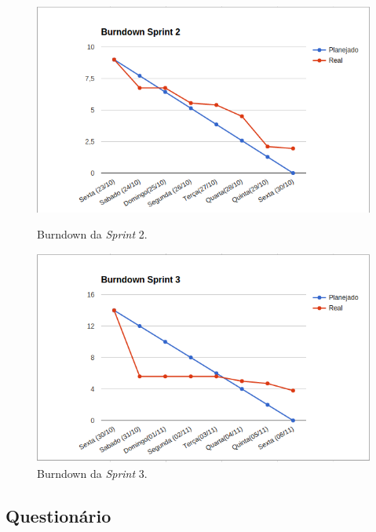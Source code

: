 	\begin{figure}[!h]
	\begin{minipage}[b]{0.5\linewidth} 
	\centering
	\includegraphics[scale=0.5]{figuras/burndown_sprint2.png}
	\caption{Burndown da \textit{Sprint} 2.}
	\label{fig:burndown2}
	\end{minipage}
	\hspace{0.5cm} 
	\begin{minipage}[b]{0.5\linewidth}
	\centering
	\includegraphics[scale=0.5]{figuras/burndown_sprint3.png}
	\caption{Burndown da \textit{Sprint} 3.}
	\label{fig:burndown3}
	\end{minipage}
	\end{figure}

	\vfill
	\pagebreak

	\subsection{Questionário}

